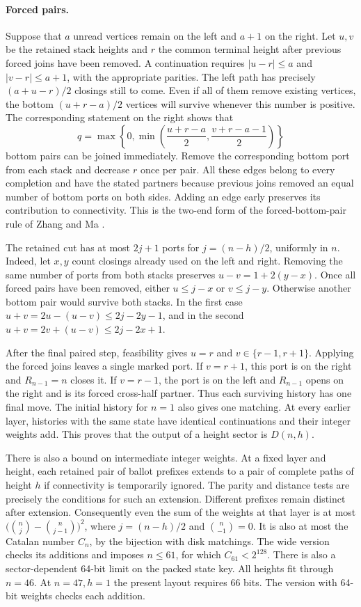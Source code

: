 \paragraph{Forced pairs.}
Suppose that \(a\) unread vertices remain on the left and \(a+1\) on the
right. Let \(u,v\) be the retained stack heights and \(r\) the common
terminal height after previous forced joins have been removed. A
continuation requires \(|u-r|\le a\) and \(|v-r|\le a+1\), with the
appropriate parities. The left path has precisely \((a+u-r)/2\)
closings still to come. Even if all of them remove existing vertices,
the bottom \((u+r-a)/2\) vertices will survive whenever this number
is positive. The corresponding statement on the right shows that
\[
 q=\max\left\{0,\min\left(\frac{u+r-a}{2},
                             \frac{v+r-a-1}{2}\right)\right\}
\]
bottom pairs can be joined immediately. Remove the corresponding bottom
port from each stack and decrease \(r\) once per pair. All these edges
belong to every completion and have the stated partners because previous
joins removed an equal number of bottom ports on both sides. Adding an
edge early preserves its contribution to connectivity. This is the
two-end form of the forced-bottom-pair rule of Zhang and Ma
\cite{zhangma2026}.

The retained cut has at most \(2j+1\) ports for
\(j=(n-h)/2\), uniformly in \(n\). Indeed, let \(x,y\) count closings
already used on the left and right. Removing the same number of ports
from both stacks preserves \(u-v=1+2(y-x)\). Once all forced pairs have
been removed, either \(u\le j-x\) or \(v\le j-y\). Otherwise another
bottom pair would survive both stacks. In the first case
\(u+v=2u-(u-v)\le2j-2y-1\), and in the second
\(u+v=2v+(u-v)\le2j-2x+1\).

After the final paired step, feasibility gives \(u=r\) and
\(v\in\{r-1,r+1\}\). Applying the forced joins leaves a single marked
port. If \(v=r+1\), this port is on the right and \(R_{n-1}=n\) closes
it. If \(v=r-1\), the port is on the left and \(R_{n-1}\) opens on the
right and is its forced cross-half partner. Thus each surviving history
has one final move. The initial history for \(n=1\) also gives one
matching. At every earlier layer, histories with the same state have
identical continuations and their integer weights add. This proves that
the output of a height sector is \(D(n,h)\).

There is also a bound on intermediate integer weights. At a fixed
layer and height, each retained pair of ballot prefixes extends to a
pair of complete paths of height \(h\) if connectivity is temporarily
ignored. The parity and distance tests are precisely the conditions for
such an extension. Different prefixes remain distinct after extension.
Consequently even the sum of the weights at that layer is at most
\(\bigl(\binom{n}{j}-\binom{n}{j-1}\bigr)^2\), where
\(j=(n-h)/2\) and \(\binom{n}{-1}=0\). It is also at most the Catalan
number \(C_n\), by the bijection with disk matchings. The wide version
checks its additions and imposes \(n\le61\), for which \(C_{61}<2^{128}\).
There is also a sector-dependent 64-bit limit on the packed state key.
All heights fit through \(n=46\). At \(n=47,h=1\) the present layout
requires 66 bits. The version with 64-bit weights checks each addition.

